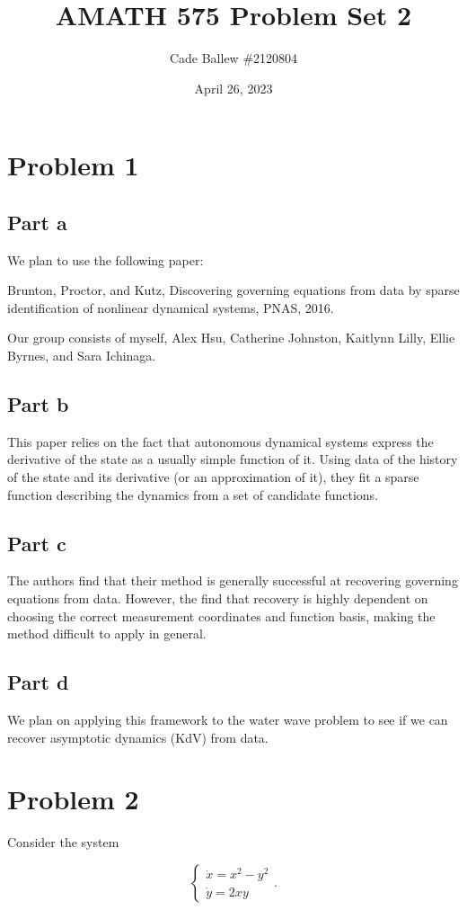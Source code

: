 \documentclass{article}
\title{AMATH 575 Problem Set 2}
\author{Cade Ballew \#2120804}
\date{April 26, 2023}
\begin{document}
	
\maketitle
	
\section{Problem 1}
\subsection{Part a}
We plan to use the following paper:

Brunton, Proctor, and Kutz, Discovering governing equations from data by sparse identification of nonlinear dynamical systems, PNAS, 2016.

Our group consists of myself, Alex Hsu, Catherine Johnston, Kaitlynn Lilly, Ellie Byrnes, and Sara Ichinaga.
\subsection{Part b}
This paper relies on the fact that autonomous dynamical systems express the derivative of the state as a usually simple function of it. Using data of the history of the state and its derivative (or an approximation of it), they fit a sparse function describing the dynamics from a set of candidate functions. 
\subsection{Part c}
The authors find that their method is generally successful at recovering governing equations from data. However, the find that recovery is highly dependent on choosing the correct measurement coordinates and function basis, making the method difficult to apply in general.
\subsection{Part d}
We plan on applying this framework to the water wave problem to see if we can recover asymptotic dynamics (KdV) from data.

\section{Problem 2}
Consider the system

\begin{equation*}
	\left\{\begin{array}{l}
		\dot x= x^2 - y^2  \\
		\dot y = 2 x y 
	\end{array}\right..
\end{equation*}
\end{document}
